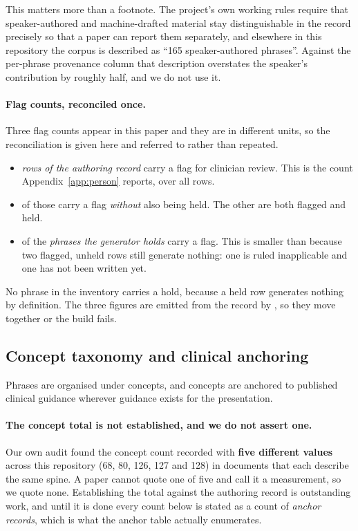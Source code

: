 This matters more than a footnote. The project's own working rules require that
speaker-authored and machine-drafted material stay distinguishable in the record
precisely so that a paper can report them separately, and elsewhere in this
repository the corpus is described as ``165 speaker-authored phrases''. Against
the per-phrase provenance column that description overstates the speaker's
contribution by roughly half, and we do not use it.
\paragraph{Flag counts, reconciled once.}
\label{sec:method:flagcounts}
Three flag counts appear in this paper and they are in different units, so the
reconciliation is given here and referred to rather than repeated.

\begin{itemize}\setlength{\itemsep}{1pt}
\item \CorpusFlagged{} \emph{rows of the authoring record} carry a flag for
  clinician review. This is the count Appendix~\ref{app:person} reports, over
  all \CorpusRows{} rows.
\item \CorpusFlaggedOnly{} of those carry a flag \emph{without} also being held.
  The other \CorpusFlaggedAndHeld{} are both flagged and held.
\item \CorpusFlaggedInInventory{} of the \CorpusInventory{} \emph{phrases the
  generator holds} carry a flag. This is smaller than \CorpusFlaggedOnly{}
  because two flagged, unheld rows still generate nothing: one is ruled
  inapplicable and one has not been written yet.
\end{itemize}

No phrase in the inventory carries a hold, because a held row generates nothing
by definition. The three figures are emitted from the record by
, so they move together or the build fails.

\subsection{Concept taxonomy and clinical anchoring}

Phrases are organised under concepts, and concepts are anchored to published
clinical guidance wherever guidance exists for the presentation.

\paragraph{The concept total is not established, and we do not assert one.}\label{sec:method:concepts} Our
own audit found the concept count recorded with \textbf{five different values}
across this repository (68, 80, 126, 127 and 128) in documents that each
describe the same spine. A paper cannot quote one of five and call it a
measurement, so we quote none. Establishing the total against the authoring
record is outstanding work, and until it is done every count below is stated as
a count of \emph{anchor records}, which is what the anchor table actually
enumerates.

